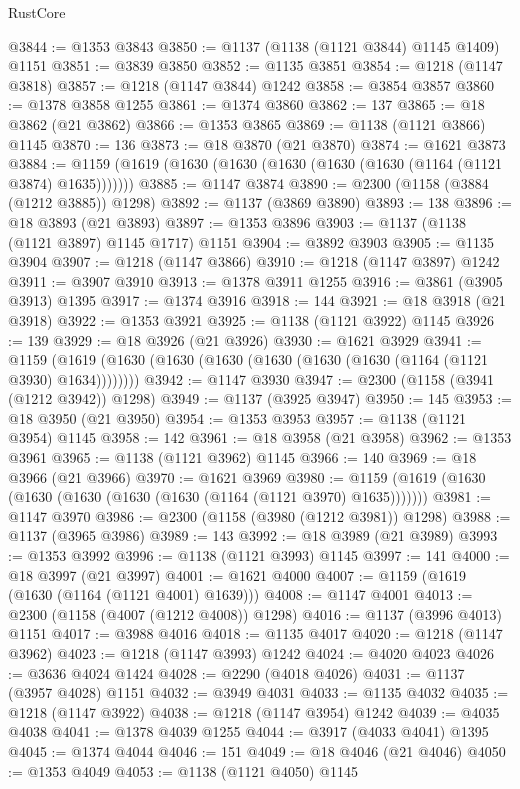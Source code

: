 \begin{lexlean}{RustCore}
\begin{coremodule}
@3844 := @1353 @3843
@3850 := @1137 (@1138 (@1121 @3844) @1145 @1409) @1151
@3851 := @3839 @3850
@3852 := @1135 @3851
@3854 := @1218 (@1147 @3818)
@3857 := @1218 (@1147 @3844) @1242
@3858 := @3854 @3857
@3860 := @1378 @3858 @1255
@3861 := @1374 @3860
@3862 := 137
@3865 := @18 @3862 (@21 @3862)
@3866 := @1353 @3865
@3869 := @1138 (@1121 @3866) @1145
@3870 := 136
@3873 := @18 @3870 (@21 @3870)
@3874 := @1621 @3873
@3884 := @1159 (@1619 (@1630 (@1630 (@1630 (@1630 (@1630 (@1164 (@1121 @3874) @1635)))))))
@3885 := @1147 @3874
@3890 := @2300 (@1158 (@3884 (@1212 @3885)) @1298)
@3892 := @1137 (@3869 @3890)
@3893 := 138
@3896 := @18 @3893 (@21 @3893)
@3897 := @1353 @3896
@3903 := @1137 (@1138 (@1121 @3897) @1145 @1717) @1151
@3904 := @3892 @3903
@3905 := @1135 @3904
@3907 := @1218 (@1147 @3866)
@3910 := @1218 (@1147 @3897) @1242
@3911 := @3907 @3910
@3913 := @1378 @3911 @1255
@3916 := @3861 (@3905 @3913) @1395
@3917 := @1374 @3916
@3918 := 144
@3921 := @18 @3918 (@21 @3918)
@3922 := @1353 @3921
@3925 := @1138 (@1121 @3922) @1145
@3926 := 139
@3929 := @18 @3926 (@21 @3926)
@3930 := @1621 @3929
@3941 := @1159 (@1619 (@1630 (@1630 (@1630 (@1630 (@1630 (@1630 (@1164 (@1121 @3930) @1634))))))))
@3942 := @1147 @3930
@3947 := @2300 (@1158 (@3941 (@1212 @3942)) @1298)
@3949 := @1137 (@3925 @3947)
@3950 := 145
@3953 := @18 @3950 (@21 @3950)
@3954 := @1353 @3953
@3957 := @1138 (@1121 @3954) @1145
@3958 := 142
@3961 := @18 @3958 (@21 @3958)
@3962 := @1353 @3961
@3965 := @1138 (@1121 @3962) @1145
@3966 := 140
@3969 := @18 @3966 (@21 @3966)
@3970 := @1621 @3969
@3980 := @1159 (@1619 (@1630 (@1630 (@1630 (@1630 (@1630 (@1164 (@1121 @3970) @1635)))))))
@3981 := @1147 @3970
@3986 := @2300 (@1158 (@3980 (@1212 @3981)) @1298)
@3988 := @1137 (@3965 @3986)
@3989 := 143
@3992 := @18 @3989 (@21 @3989)
@3993 := @1353 @3992
@3996 := @1138 (@1121 @3993) @1145
@3997 := 141
@4000 := @18 @3997 (@21 @3997)
@4001 := @1621 @4000
@4007 := @1159 (@1619 (@1630 (@1164 (@1121 @4001) @1639)))
@4008 := @1147 @4001
@4013 := @2300 (@1158 (@4007 (@1212 @4008)) @1298)
@4016 := @1137 (@3996 @4013) @1151
@4017 := @3988 @4016
@4018 := @1135 @4017
@4020 := @1218 (@1147 @3962)
@4023 := @1218 (@1147 @3993) @1242
@4024 := @4020 @4023
@4026 := @3636 @4024 @1424
@4028 := @2290 (@4018 @4026)
@4031 := @1137 (@3957 @4028) @1151
@4032 := @3949 @4031
@4033 := @1135 @4032
@4035 := @1218 (@1147 @3922)
@4038 := @1218 (@1147 @3954) @1242
@4039 := @4035 @4038
@4041 := @1378 @4039 @1255
@4044 := @3917 (@4033 @4041) @1395
@4045 := @1374 @4044
@4046 := 151
@4049 := @18 @4046 (@21 @4046)
@4050 := @1353 @4049
@4053 := @1138 (@1121 @4050) @1145

\end{coremodule}
\end{lexlean}
